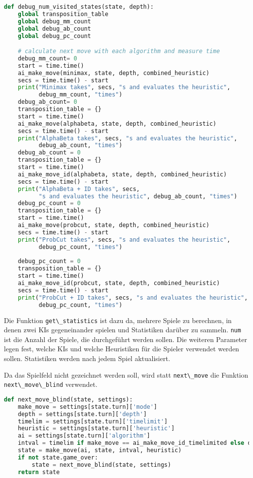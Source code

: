 \begin{lstlisting}[language=Python]
def debug_num_visited_states(state, depth):
    global transposition_table
    global debug_mm_count
    global debug_ab_count
    global debug_pc_count

    # calculate next move with each algorithm and measure time
    debug_mm_count= 0
    start = time.time()
    ai_make_move(minimax, state, depth, combined_heuristic)
    secs = time.time() - start
    print("Minimax takes", secs, "s and evaluates the heuristic",
          debug_mm_count, "times")
    debug_ab_count= 0
    transposition_table = {}
    start = time.time()
    ai_make_move(alphabeta, state, depth, combined_heuristic)
    secs = time.time() - start
    print("AlphaBeta takes", secs, "s and evaluates the heuristic",
          debug_ab_count, "times")
    debug_ab_count = 0
    transposition_table = {}
    start = time.time()
    ai_make_move_id(alphabeta, state, depth, combined_heuristic)
    secs = time.time() - start
    print("AlphaBeta + ID takes", secs,
          "s and evaluates the heuristic", debug_ab_count, "times")
    debug_pc_count = 0
    transposition_table = {}
    start = time.time()
    ai_make_move(probcut, state, depth, combined_heuristic)
    secs = time.time() - start
    print("ProbCut takes", secs, "s and evaluates the heuristic",
          debug_pc_count, "times")
    
    debug_pc_count = 0
    transposition_table = {}
    start = time.time()
    ai_make_move_id(probcut, state, depth, combined_heuristic)
    secs = time.time() - start
    print("ProbCut + ID takes", secs, "s and evaluates the heuristic",
          debug_pc_count, "times")
\end{lstlisting}

Die Funktion \passthrough{\lstinline!get\_statistics!} ist dazu da,
mehrere Spiele zu berechnen, in denen zwei \acp{KI} gegeneinander
spielen und Statistiken darüber zu sammeln.
\passthrough{\lstinline!num!} ist die Anzahl der Spiele, die
durchgeführt werden sollen. Die weiteren Parameter legen fest, welche
\acp{KI} und welche Heuristiken für die Spieler verwendet werden sollen.
Statistiken werden nach jedem Spiel aktualisiert.

Da das Spielfeld nicht gezeichnet werden soll, wird statt
\passthrough{\lstinline!next\_move!} die Funktion
\passthrough{\lstinline!next\_move\_blind!} verwendet.

\begin{lstlisting}[language=Python]
def next_move_blind(state, settings):
    make_move = settings[state.turn]['mode']
    depth = settings[state.turn]['depth']
    timelim = settings[state.turn]['timelimit']
    heuristic = settings[state.turn]['heuristic']
    ai = settings[state.turn]['algorithm']
    intval = timelim if make_move == ai_make_move_id_timelimited else depth
    state = make_move(ai, state, intval, heuristic)
    if not state.game_over:
        state = next_move_blind(state, settings)
    return state
\end{lstlisting}


